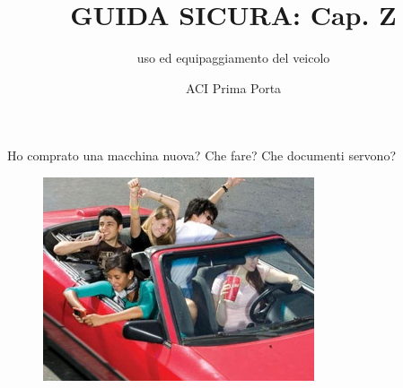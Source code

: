\documentclass{beamer}
\title{GUIDA SICURA: Cap. Z}
\subtitle{uso ed equipaggiamento del veicolo}
\author{ACI Prima Porta}
\date{}
\begin{document}
    \begin{frame}
        \maketitle
    \end{frame}
    
    
    
    \begin{frame}{Ho comprato una macchina nuova?}
    Che fare? Che documenti servono?
    
    \begin{figure}[ht!]
    \centering
         \includegraphics[width = 8cm]{images/new_car.jpg}
    \end{figure}
      \end{frame}
      
\end{document}
